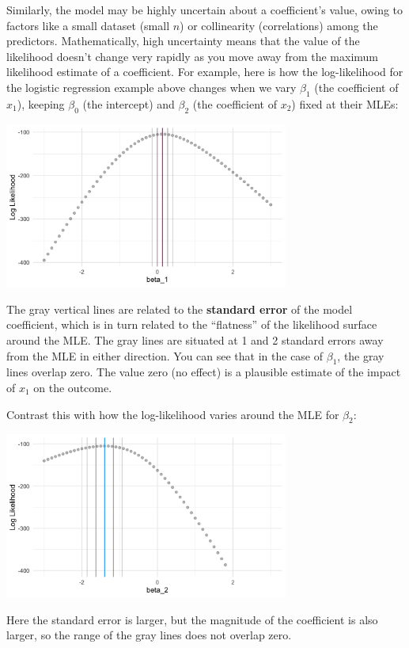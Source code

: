 Similarly, the model may be highly uncertain about a coefficient's value, owing to factors like a small dataset (small $n$) or collinearity (correlations) among the predictors. Mathematically, high uncertainty means that the value of the likelihood doesn't change very rapidly as you move away from the maximum likelihood estimate of a coefficient. For example, here is how the log-likelihood for the logistic regression example above changes when we vary $\beta_1$ (the coefficient of $x_1$), keeping $\beta_0$ (the intercept) and $\beta_2$ (the coefficient of $x_2$) fixed at their MLEs: 
\begin{center}
\includegraphics[width=0.7\textwidth]{img/esl-logistic-beta1.png}
\end{center}
The gray vertical lines are related to the \textbf{standard error} of the model coefficient, which is in turn related to the ``flatness'' of the likelihood surface around the MLE. The gray lines are situated at 1 and 2 standard errors away from the MLE in either direction. You can see that in the case of $\beta_1$, the gray lines overlap zero. The value zero (no effect) is a plausible estimate of the impact of $x_1$ on the outcome. 

Contrast this with how the log-likelihood varies around the MLE for $\beta_2$:
\begin{center}
\includegraphics[width=0.7\textwidth]{img/esl-logistic-beta2.png}
\end{center}
Here the standard error is larger, but the magnitude of the coefficient is also larger, so the range of the gray lines does not overlap zero.

